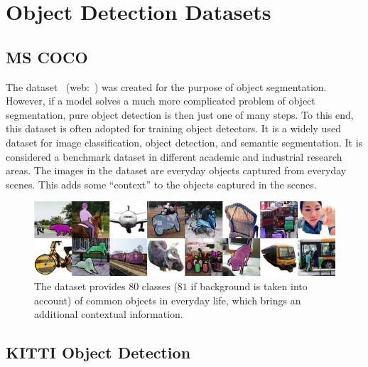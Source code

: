 \section{Object Detection Datasets}
\label{sec:ObjectDetectionDatasets}

\subsection{MS COCO}
\label{ssec:DatasetMSCOCO}

The  dataset~\cite{Lin2014} (web:~\cite{mscocodataset}) was created for the purpose of object segmentation. However, if a model solves a much more complicated problem of object segmentation, pure object detection is then just one of many steps. To this end, this dataset is often adopted for training object detectors. It is a widely used dataset for image classification, object detection, and semantic segmentation. It is considered a benchmark dataset in different academic and industrial research areas. The images in the dataset are everyday objects captured from everyday scenes. This adds some “context” to the objects captured in the scenes.

\begin{figure}[t]
    \centerline{\includegraphics[width=\linewidth]{figures/datasets/ms_coco_sample.jpeg}}
    \caption[ dataset]{The  dataset provides $80$ classes ($81$ if background is taken into account) of common objects in everyday life, which brings an additional contextual information. }
    \label{fig:DatasetMSCOCO}
\end{figure}

\subsection{KITTI Object Detection}
\label{ssec:DatasetKITTIObjectDetection}

